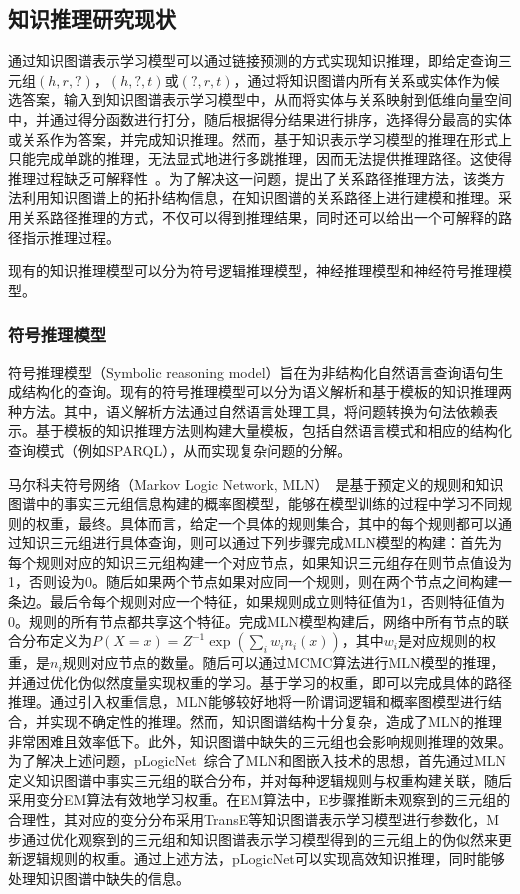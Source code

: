 \documentclass[algorithmlist, AutoFakeBold, AutoFakeSlant, figurelist, tablelist, nomlist, masters]{seuthesix}
\begin{document}
\subsection{知识推理研究现状}
通过知识图谱表示学习模型可以通过链接预测的方式实现知识推理，即给定查询三元组$\left(h, r, ?\right)$，$\left(h, ?, t\right)$或$\left(?, r, t\right)$，通过将知识图谱内所有关系或实体作为候选答案，输入到知识图谱表示学习模型中，从而将实体与关系映射到低维向量空间中，并通过得分函数进行打分，随后根据得分结果进行排序，选择得分最高的实体或关系作为答案，并完成知识推理。然而，基于知识表示学习模型的推理在形式上只能完成单跳的推理，无法显式地进行多跳推理，因而无法提供推理路径。这使得推理过程缺乏可解释性~\cite{wang2019deeppath}。为了解决这一问题，提出了关系路径推理方法，该类方法利用知识图谱上的拓扑结构信息，在知识图谱的关系路径上进行建模和推理。采用关系路径推理的方式，不仅可以得到推理结果，同时还可以给出一个可解释的路径指示推理过程。

现有的知识推理模型可以分为符号逻辑推理模型，神经推理模型和神经符号推理模型。

\subsubsection{符号推理模型}
符号推理模型（Symbolic reasoning model）旨在为非结构化自然语言查询语句生成结构化的查询。现有的符号推理模型可以分为语义解析和基于模板的知识推理两种方法。其中，语义解析方法通过自然语言处理工具，将问题转换为句法依赖表示。基于模板的知识推理方法则构建大量模板，包括自然语言模式和相应的结构化查询模式（例如SPARQL），从而实现复杂问题的分解。

马尔科夫符号网络（Markov Logic Network, MLN）~\cite{richardson2006markov}是基于预定义的规则和知识图谱中的事实三元组信息构建的概率图模型，能够在模型训练的过程中学习不同规则的权重，最终。具体而言，给定一个具体的规则集合，其中的每个规则都可以通过知识三元组进行具体查询，则可以通过下列步骤完成MLN模型的构建：首先为每个规则对应的知识三元组构建一个对应节点，如果知识三元组存在则节点值设为1，否则设为0。随后如果两个节点如果对应同一个规则，则在两个节点之间构建一条边。最后令每个规则对应一个特征，如果规则成立则特征值为1，否则特征值为0。规则的所有节点都共享这个特征。完成MLN模型构建后，网络中所有节点的联合分布定义为$P(X=x)=Z^{-1} \exp \left(\sum_i w_i n_i(x)\right)$，其中$w_i$是对应规则的权重，是$n_i$规则对应节点的数量。随后可以通过MCMC算法进行MLN模型的推理，并通过优化伪似然度量实现权重的学习。基于学习的权重，即可以完成具体的路径推理。通过引入权重信息，MLN能够较好地将一阶谓词逻辑和概率图模型进行结合，并实现不确定性的推理。然而，知识图谱结构十分复杂，造成了MLN的推理非常困难且效率低下。此外，知识图谱中缺失的三元组也会影响规则推理的效果。为了解决上述问题，pLogicNet~\cite{qu2019probabilistic}综合了MLN和图嵌入技术的思想，首先通过MLN定义知识图谱中事实三元组的联合分布，并对每种逻辑规则与权重构建关联，随后采用变分EM算法有效地学习权重。在EM算法中，E步骤推断未观察到的三元组的合理性，其对应的变分分布采用TransE等知识图谱表示学习模型进行参数化，M步通过优化观察到的三元组和知识图谱表示学习模型得到的三元组上的伪似然来更新逻辑规则的权重。通过上述方法，pLogicNet可以实现高效知识推理，同时能够处理知识图谱中缺失的信息。
\end{document}
